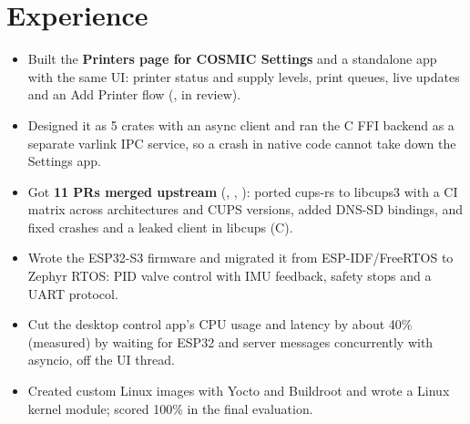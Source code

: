 \documentclass[10pt]{article}
\begin{document}
\section*{Experience}
\begin{itemize}
  \item Built the \textbf{Printers page for COSMIC Settings} and a standalone app with the same UI: printer status and supply levels, print queues, live updates and an Add Printer flow (, in review).
  \item Designed it as 5 crates with an async client and ran the C FFI backend as a separate varlink IPC service, so a crash in native code cannot take down the Settings app.
  \item Got \textbf{11 PRs merged upstream} (, , ): ported cups-rs to libcups3 with a CI matrix across architectures and CUPS versions, added DNS-SD bindings, and fixed crashes and a leaked client in libcups (C).
\end{itemize}
\begin{itemize}
  \item Wrote the ESP32-S3 firmware and migrated it from ESP-IDF/FreeRTOS to Zephyr RTOS: PID valve control with IMU feedback, safety stops and a UART protocol.
  \item Cut the desktop control app's CPU usage and latency by about 40\% (measured) by waiting for ESP32 and server messages concurrently with asyncio, off the UI thread.
\end{itemize}
\begin{itemize}
  \item Created custom Linux images with Yocto and Buildroot and wrote a Linux kernel module; scored 100\% in the final evaluation.
\end{itemize}
\end{document}
